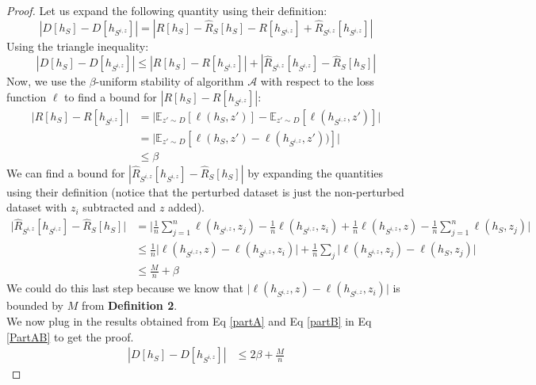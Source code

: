 \documentclass{article}
\begin{document}
\begin{proof}
Let us expand the following quantity using their definition: 
\begin{equation}\label{def_risk}
|D[h_S] - D[h_{S^{i,z}}]| = |R[h_S] - \hat{R}_S[h_S] - R[h_{S^{i,z}}] + \hat{R}_{S^{i,z}}[h_{S^{i,z}}]|
\end{equation}
Using the triangle inequality:
\begin{equation}
|D[h_S] - D[h_{S^{i,z}}]| \leq |R[h_S] - R[h_{S^{i,z}}]| + |\hat{R}_{S^{i,z}}[h_{S^{i,z}}] - \hat{R}_S[h_S]| \label{PartAB}
\end{equation}
Now, we use the $\beta$-uniform stability of algorithm $\mathcal{A}$ with respect to the loss function $\ell$ to find a bound for $|R[h_S] - R[h_{S^{i,z}}]|$:
\begin{equation}
\begin{split}
\bigl|R[h_S] - R[h_{S^{i,z}}]\bigr| &= \bigl| \mathbb{E}_{z' \sim D} [\ell(h_S, z')] - \mathbb{E}_{z' \sim D} [\ell(h_{S^{i,z}}, z')] \bigr| \\ 
&= \bigl|\mathbb{E}_{z' \sim D} [\ell(h_S, z') - \ell(h_{S^{i,z}}, z'))]\bigr| \\
& \leq \beta \label{partA}
\end{split}
\end{equation}
We can find a bound for $|\hat{R}_{S^{i,z}}[h_{S^{i,z}}] - \hat{R}_S[h_S]|$ by expanding the quantities using their definition (notice that the perturbed dataset is just the non-perturbed dataset with $z_i$ subtracted and $z$ added).
\begin{equation}
\begin{split}
\bigl|\hat{R}_{S^{i,z}}[h_{S^{i,z}}] - \hat{R}_S[h_S]\bigr| &= \biggr|\frac{1}{n}\sum_{j=1}^{n}\ell(h_{S^{i,z}}, z_j) - \frac{1}{n}\ell(h_{S^{i,z}}, z_i) + \frac{1}{n}\ell(h_{S^{i,z}}, z) - \frac{1}{n}\sum_{j=1}^{n}\ell(h_S, z_j)\biggl|\\
&\leq \frac{1}{n} \biggl|\ell(h_{S^{i,z}}, z) - \ell(h_{S^{i,z}}, z_i)\biggr| + \frac{1}{n}\sum_j\biggl|\ell(h_{S^{i,z}}, z_j) -  \ell(h_S, z_j)\biggr| \\
&\leq \frac{M}{n} + \beta \label{partB}
\end{split}
\end{equation}
We could do this last step because we know that $\biggl|\ell(h_{S^{i,z}}, z) - \ell(h_{S^{i,z}}, z_i)\biggr|$ is bounded by $M$ from \textbf{Definition 2}.  \\
We now plug in the results obtained from Eq \ref{partA} and Eq \ref{partB} in Eq \ref{PartAB} to get the proof.
\begin{equation}\label{proof1}
\begin{split}
|D[h_S] - D[h_{S^{i,z}}]| & \leq 2\beta + \frac{M}{n}
\end{split}
\end{equation}
\end{proof}
\end{document}
